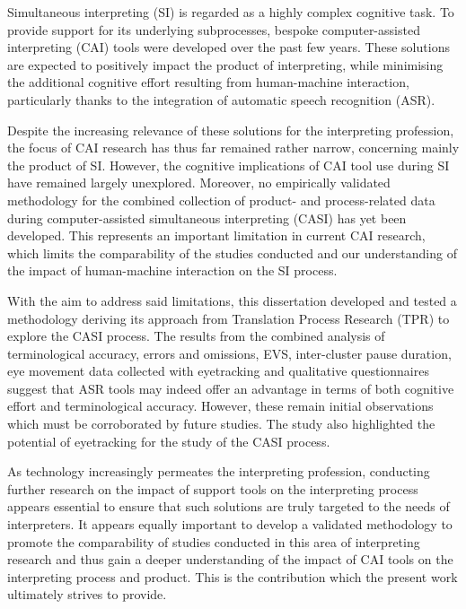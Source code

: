 Simultaneous interpreting (SI) is regarded as a highly complex cognitive task. To provide support for its underlying subprocesses, bespoke computer-assisted interpreting (CAI) tools were developed over the past few years. These solutions are expected to positively impact the product of interpreting, while minimising the additional cognitive effort resulting from human-machine interaction, particularly thanks to the integration of automatic speech recognition (ASR).

Despite the increasing relevance of these solutions for the interpreting profession, the focus of CAI research has thus far remained rather narrow, concerning mainly the product of SI. However, the cognitive implications of CAI tool use during SI have remained largely unexplored. Moreover, no empirically validated methodology for the combined collection of product- and process-related data during computer-assisted simultaneous interpreting (CASI) has yet been developed. This represents an important limitation in current CAI research, which limits the comparability of the studies conducted and our understanding of the impact of human-machine interaction on the SI process.

With the aim to address said limitations, this dissertation developed and tested a methodology deriving its approach from Translation Process Research (TPR) to explore the CASI process. The results from the combined analysis of terminological accuracy, errors and omissions, EVS, inter-cluster pause duration, eye movement data collected with eyetracking and qualitative questionnaires suggest that ASR tools may indeed offer an advantage in terms of both cognitive effort and terminological accuracy. However, these remain initial observations which must be corroborated by future studies. The study also highlighted the potential of eyetracking for the study of the CASI process.

As technology increasingly permeates the interpreting profession, conducting further research on the impact of support tools on the interpreting process appears essential to ensure that such solutions are truly targeted to the needs of interpreters. It appears equally important to develop a validated methodology to promote the comparability of studies conducted in this area of interpreting research and thus gain a deeper understanding of the impact of CAI tools on the interpreting process and product. This is the contribution which the present work ultimately strives to provide.
